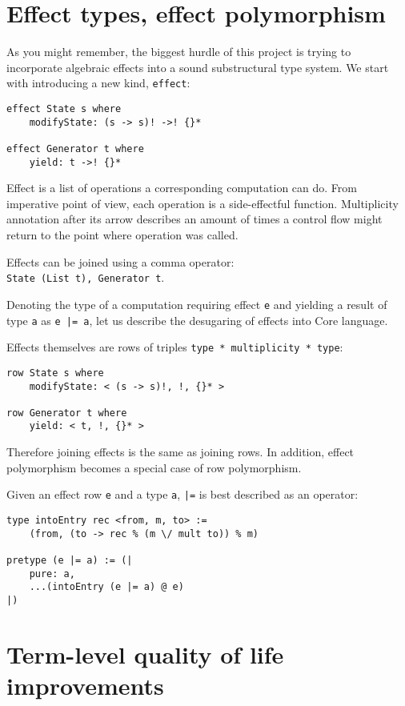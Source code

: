 \documentclass[a4paper,14pt]{extreport}
\begin{document}
\section{Effect types, effect polymorphism}

As you might remember, the biggest hurdle of this project is trying to
incorporate algebraic effects into a sound substructural type system. We start
with introducing a new kind, \verb|effect|:

\begin{verbatim}
effect State s where
    modifyState: (s -> s)! ->! {}*

effect Generator t where
    yield: t ->! {}*
\end{verbatim}

Effect is a list of operations a corresponding computation can do. From
imperative point of view, each operation is a side-effectful function.
Multiplicity annotation after its arrow describes an amount of times a control
flow might return to the point where operation was called.

Effects can be joined using a comma operator: \\
\verb|State (List t), Generator t|.

Denoting the type of a computation requiring effect \verb|e| and yielding a
result of type \verb|a| as \verb+e |= a+, let us describe the desugaring of
effects into Core language.

Effects themselves are rows of triples \verb|type * multiplicity * type|:

\begin{verbatim}
row State s where
    modifyState: < (s -> s)!, !, {}* >

row Generator t where
    yield: < t, !, {}* >
\end{verbatim}

Therefore joining effects is the same as joining rows. In addition, effect
polymorphism becomes a special case of row polymorphism.

Given an effect row \verb|e| and a type \verb|a|, \verb+|=+ is best described
as an operator:

\begin{verbatim}
type intoEntry rec <from, m, to> :=
    (from, (to -> rec % (m \/ mult to)) % m)

pretype (e |= a) := (|
    pure: a,
    ...(intoEntry (e |= a) @ e)
|)
\end{verbatim}

\section{Term-level quality of life improvements}
\end{document}
